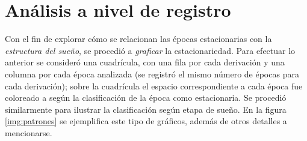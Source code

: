 \documentclass[12pt,letterpaper]{book}
\begin{document}
\section{Análisis a nivel de registro}
\label{sec:analisis_registro}


Con el fin de explorar cómo se relacionan las épocas estacionarias con la \textit{estructura del sueño}, se procedió a \textit{graficar} la estacionariedad.
%
Para efectuar lo anterior se consideró una cuadrícula, con una fila por cada derivación y una columna por cada época analizada (se registró el mismo número de épocas para cada derivación); sobre la cuadrícula el espacio correspondiente a cada época fue coloreado a según la clasificación de la época como estacionaria.
%
Se procedió similarmente para ilustrar la clasificación según etapa de sueño.
%
En la figura \ref{img:patrones} se ejemplifica este tipo de gráficos, además de otros detalles a mencionarse.
\end{document}
